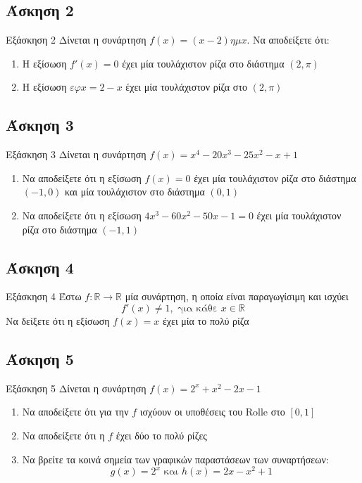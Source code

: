 \documentclass[greek]{beamer}
\begin{document}
\subsection{Άσκηση 2}
\begin{frame}[label=Άσκηση2]{Εξάσκηση 2}
 Δίνεται η συνάρτηση $f(x)=(x-2)ημx$. Να αποδείξετε ότι:
 \begin{enumerate}
  \item<1-> Η εξίσωση $f'(x)=0$ έχει μία τουλάχιστον ρίζα στο διάστημα $(2,π)$
  \item<2-> Η εξίσωση $εφx=2-x$ έχει μία τουλάχιστον ρίζα στο $(2,π)$
 \end{enumerate}

\end{frame}

\subsection{Άσκηση 3}
\begin{frame}[label=Άσκηση3]{Εξάσκηση 3}
 Δίνεται η συνάρτηση $f(x)=x^4-20x^3-25x^2-x+1$
 \begin{enumerate}
  \item<1-> Να αποδείξετε ότι η εξίσωση $f(x)=0$ έχει μία τουλάχιστον ρίζα στο διάστημα $(-1,0)$ και μία τουλάχιστον στο διάστημα $(0,1)$
  \item<2-> Να αποδείξετε ότι η εξίσωση $4x^3-60x^2-50x-1=0$ έχει μία τουλάχιστον ρίζα στο διάστημα $(-1,1)$
 \end{enumerate}
\end{frame}

\subsection{Άσκηση 4}
\begin{frame}[label=Άσκηση4]{Εξάσκηση 4}
 Έστω $f:\mathbb{R}\to\mathbb{R}$ μία συνάρτηση, η οποία είναι παραγωγίσιμη και ισχύει
 $$f'(x)\ne 1, \text{ για κάθε } x\in\mathbb{R}$$
 Να δείξετε ότι η εξίσωση $f(x)=x$ έχει μία το πολύ ρίζα
\end{frame}

\subsection{Άσκηση 5}
\begin{frame}[label=Άσκηση5]{Εξάσκηση 5}
 Δίνεται η συνάρτηση $f(x)=2^x+x^2-2x-1$
 \begin{enumerate}
  \item<1-> Να αποδείξετε ότι για την $f$ ισχύουν οι υποθέσεις του Rolle στο $[0,1]$
  \item<2-> Να αποδείξετε ότι η $f$ έχει δύο το πολύ ρίζες
  \item<3-> Να βρείτε τα κοινά σημεία των γραφικών παραστάσεων των συναρτήσεων:
   $$g(x)=2^x \text{ και } h(x)=2x-x^2+1$$
 \end{enumerate}
\end{frame}
\end{document}
